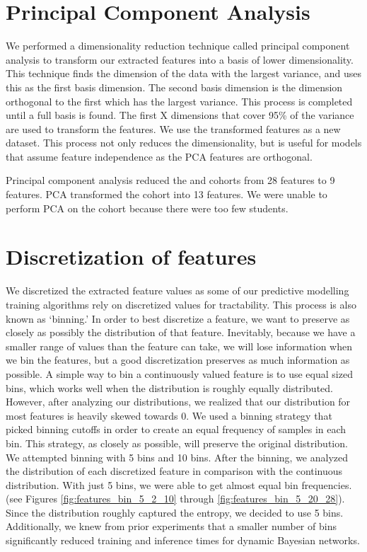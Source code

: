 \section{Principal Component Analysis}
We performed a dimensionality reduction technique called principal component analysis to transform our extracted features into a basis of lower dimensionality. This technique finds the dimension of the data with the largest variance, and uses this as the first basis dimension. The second basis dimension is the dimension orthogonal to the first which has the largest variance. This process is completed until a full basis is found. The first X dimensions that cover 95\% of the variance are used to transform the features. We use the transformed features as a new dataset. This process not only reduces the dimensionality, but is useful for models that assume feature independence as the PCA features are orthogonal.

Principal component analysis reduced the \neither and \forum cohorts from 28 features to 9 features. PCA transformed the \both cohort into 13 features. We were unable to perform PCA on the \wiki cohort because there were too few students.

\section{Discretization of features}\label{section:binning}
We discretized the extracted feature values as some of our predictive modelling training algorithms rely on discretized values for tractability. This process is also known as ‘binning.’ In order to best discretize a feature, we want to preserve as closely as possibly the distribution of that feature. Inevitably, because we have a smaller range of values than the feature can take, we will lose information when we bin the features, but a good discretization preserves as much information as possible. 
A simple way to bin a continuously valued feature is to use equal sized bins, which works well when the distribution is roughly equally distributed. However, after analyzing our distributions, we realized that our distribution for most features is heavily skewed towards 0. We used a binning strategy that picked binning cutoffs in order to create an equal frequency of samples in each bin. This strategy, as closely as possible, will preserve the original distribution.
We attempted binning with 5 bins and 10 bins. After the binning, we analyzed the distribution of each discretized feature in comparison with the continuous distribution. With just 5 bins, we were able to get almost equal bin frequencies. (see Figures \ref{fig:features_bin_5_2_10} through \ref{fig:features_bin_5_20_28}). Since the distribution roughly captured the entropy, we decided to use 5 bins. Additionally, we knew from prior experiments that a smaller number of bins significantly reduced training and inference times for dynamic Bayesian networks.

